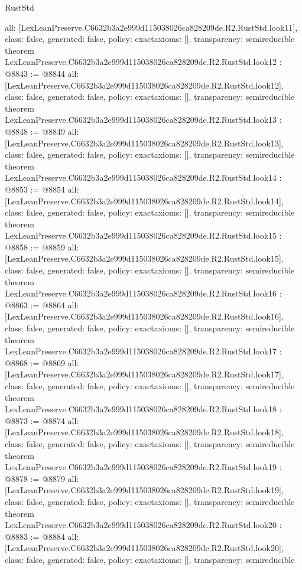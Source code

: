 \begin{lexlean}{RustStd}
\begin{coremodule}
{  all: [LexLeanPreserve.C6632b3a2e999d115038026ca828209de.R2.RustStd.look11],
  class: false,
  generated: false,
  policy: exact{axioms: []},
  transparency: semireducible
}
theorem LexLeanPreserve.C6632b3a2e999d115038026ca828209de.R2.RustStd.look12 : @8843 := @8844 {
  all: [LexLeanPreserve.C6632b3a2e999d115038026ca828209de.R2.RustStd.look12],
  class: false,
  generated: false,
  policy: exact{axioms: []},
  transparency: semireducible
}
theorem LexLeanPreserve.C6632b3a2e999d115038026ca828209de.R2.RustStd.look13 : @8848 := @8849 {
  all: [LexLeanPreserve.C6632b3a2e999d115038026ca828209de.R2.RustStd.look13],
  class: false,
  generated: false,
  policy: exact{axioms: []},
  transparency: semireducible
}
theorem LexLeanPreserve.C6632b3a2e999d115038026ca828209de.R2.RustStd.look14 : @8853 := @8854 {
  all: [LexLeanPreserve.C6632b3a2e999d115038026ca828209de.R2.RustStd.look14],
  class: false,
  generated: false,
  policy: exact{axioms: []},
  transparency: semireducible
}
theorem LexLeanPreserve.C6632b3a2e999d115038026ca828209de.R2.RustStd.look15 : @8858 := @8859 {
  all: [LexLeanPreserve.C6632b3a2e999d115038026ca828209de.R2.RustStd.look15],
  class: false,
  generated: false,
  policy: exact{axioms: []},
  transparency: semireducible
}
theorem LexLeanPreserve.C6632b3a2e999d115038026ca828209de.R2.RustStd.look16 : @8863 := @8864 {
  all: [LexLeanPreserve.C6632b3a2e999d115038026ca828209de.R2.RustStd.look16],
  class: false,
  generated: false,
  policy: exact{axioms: []},
  transparency: semireducible
}
theorem LexLeanPreserve.C6632b3a2e999d115038026ca828209de.R2.RustStd.look17 : @8868 := @8869 {
  all: [LexLeanPreserve.C6632b3a2e999d115038026ca828209de.R2.RustStd.look17],
  class: false,
  generated: false,
  policy: exact{axioms: []},
  transparency: semireducible
}
theorem LexLeanPreserve.C6632b3a2e999d115038026ca828209de.R2.RustStd.look18 : @8873 := @8874 {
  all: [LexLeanPreserve.C6632b3a2e999d115038026ca828209de.R2.RustStd.look18],
  class: false,
  generated: false,
  policy: exact{axioms: []},
  transparency: semireducible
}
theorem LexLeanPreserve.C6632b3a2e999d115038026ca828209de.R2.RustStd.look19 : @8878 := @8879 {
  all: [LexLeanPreserve.C6632b3a2e999d115038026ca828209de.R2.RustStd.look19],
  class: false,
  generated: false,
  policy: exact{axioms: []},
  transparency: semireducible
}
theorem LexLeanPreserve.C6632b3a2e999d115038026ca828209de.R2.RustStd.look20 : @8883 := @8884 {
  all: [LexLeanPreserve.C6632b3a2e999d115038026ca828209de.R2.RustStd.look20],
  class: false,
  generated: false,
  policy: exact{axioms: []},
  transparency: semireducible
}
\end{coremodule}
\end{lexlean}

